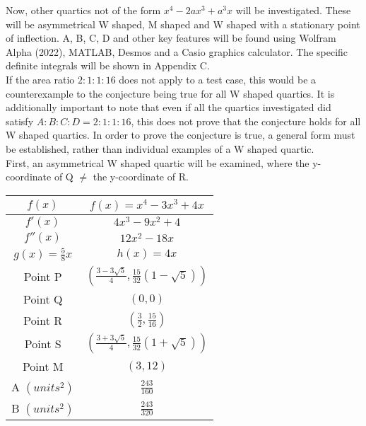 \documentclass{homework}
\begin{document}
\begin{flushleft}
    Now, other quartics not of the form $x^4-2ax^3+a^3x$ will be investigated.
    These will be asymmetrical W shaped, M shaped and W shaped with a stationary point of inflection. A, B, C, D and other key features will be found using Wolfram Alpha (2022), MATLAB, Desmos and a Casio graphics calculator. The specific definite integrals will be shown in Appendix C. \vspace{1em} \\
    If the area ratio $2:1:1:16$ does not apply to a test case, this would be a counterexample to the conjecture being true for all W shaped quartics.
    It is additionally important to note that even if all the quartics investigated did satisfy $A:B:C:D=2:1:1:16$, this does not prove that the conjecture holds for all W shaped quartics. In order to prove the conjecture is true, a general form must be established, rather than individual examples of a W shaped quartic. \vspace{1em} \\ \newpage
    First, an asymmetrical W shaped quartic will be examined, where the y-coordinate of Q $\neq$ the y-coordinate of R.  \vspace{1em} \\
    \begin{paracol}{2}
        \begingroup
        \setlength{\tabcolsep}{1.7em}
        \renewcommand{\arraystretch}{1.4}
        \begin{tabular}{|c|c|} \hline
         $f(x)$  & $f(x)=x^{4}-3x^{3}+4x$ \\ \hline
         $f'(x)$  & $4x^3 - 9x^2 + 4 $ \\ \hline
         $f''(x)$  & $12x^2 - 18x $ \\ \hline
            $g(x)=\frac{5}{8}x $  & $h(x)=4x $ \\ \hline
          Point P & $(\frac{3-3\sqrt{5}}{4},\frac{15}{32}(1-\sqrt{5}))$ \\ \hline
          Point Q & $(0, 0)$ \\ \hline
          Point R & $(\frac{3}{2}, \frac{15}{16})$ \\ \hline
          Point S & $(\frac{3+3\sqrt{5}}{4},\frac{15}{32}(1+\sqrt{5}))$ \\ \hline
          Point M & $(3,12)$ \\ \hline
        A $(units^2)$ & $\frac{243}{160}$\\ \hline
        B $(units^2)$ & $\frac{243}{320}$ \\ \hline

\end{tabular}
\end{paracol}
\end{flushleft}
\end{document}
